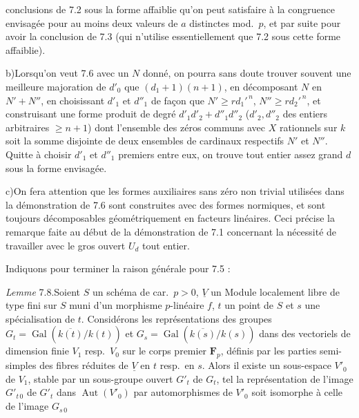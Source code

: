 \documentclass[11pt,a4paper]{article}
\begin{document}


conclusions de 7.2\supplied{,} sous la forme affaiblie qu'on peut satisfaire à la
congruence envisagée pour au moins deux valeurs de $a$ distinctes mod.~$p$, et
par suite pour avoir la conclusion de 7.3 (qui n'utilise essentiellement que 7.2
sous cette forme affaiblie).

b)\quad Lorsqu'on veut 7.6 avec un $N$ donné, on pourra sans doute trouver
souvent une meilleure majoration de $d'_0$ que $(d_1 + 1)(n+1)$, en décomposant
$N$ en $N' + N''$, en choisissant $d'_1$ et $d''_1$ de façon que $N' \geqslant r
d_1'^{\,n}$, $N'' \geqslant r d_2'^{\,n}$, et construisant une forme produit de
degré  $d'_1 d'_2 + d''_1 d''_2$ ($d'_2, d''_2$ des entiers
arbitraires $\geqslant n+1$) dont l'ensemble des zéros communs avec $X$
rationnels sur $k$ soit la somme disjointe de deux ensembles de cardinaux
respectifs $N'$ et $N''$. Quitte à choisir $d'_1$ et $d''_1$ premiers entre eux,
on trouve  tout entier assez grand $d$  sous la forme
envisagée.

c)\quad On fera attention que les formes auxiliaires sans zéro non trivial
utilisées dans la démonstration de 7.6 sont construites avec des formes
normiques, et sont toujours décomposables géométriquement en facteurs linéaires.
Ceci précise la remarque faite au début de la démonstration de 7.1 concernant la
nécessité de travailler avec le gros ouvert $U_d$ tout entier.

Indiquons pour terminer la raison générale pour 7.5 :

\emph{Lemme} 7.8.\quad Soient $S$ un schéma  de car.\ $p > 0$,
$\underline{V}$ un Module localement libre de type fini sur $S$ muni d'un
morphisme $p$-linéaire $f$, $t$ un point de $S$ et $s$ une
spécialisation de $t$. Considérons les représentations des groupes $G_t =
\operatorname{Gal}(\overline{k(t)}/k(t))$ et $G_s =
\operatorname{Gal}(\overline{k(s)}/k(s))$ dans des vectoriels de dimension finie
$V_1$ resp.\ $V_0$ sur le corps premier $\mathbf{F}_p$, définis par les parties
semi-simples des fibres réduites de $\underline{V}$ en $t$ resp.\ en $s$. Alors il
existe un sous-espace $V'_0$ de $V_1$, stable par un sous-groupe ouvert $G'_t$ de
$G_t$, tel  la représentation de l'image $G'_{t\,0}$ de $G'_t$ dans
$\operatorname{Aut}(V'_0)$ par automorphismes de $V'_0$ soit isomorphe à celle de
l'image $G_{s\,0}$
\end{document}
